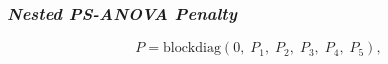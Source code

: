 \documentclass[12pt]{beamer}
\newcommand{\ms}{\scriptscriptstyle}
\begin{document}
\begin{frame}
\frametitle{\emph{Nested PS-ANOVA Penalty}}

\begin{equation} \label{eq:PSANOVA-penalty}
P = \mbox{blockdiag}\left(0,\; P_1, \; P_2, \; P_{3},\; P_4, \; P_{5} \right),
\end{equation}


\end{frame}





\end{document}
